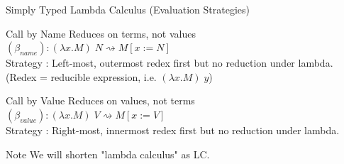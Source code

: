 \documentclass[10pt]{beamer}
\newcommand{\lam}[2]{\lambda #1 . #2}
\newcommand{\app}[2]{#1 \; #2}
\newcommand{\subst}[2]{[#1 := #2]}
\begin{document}
\begin{frame}[fragile]{Simply Typed Lambda Calculus (Evaluation Strategies)}
  \begin{alertblock}{Call by Name}
    Reduces on terms, not values \\
    $(\beta_{name}) : \app{(\lam{x}{M})}{N} \rightsquigarrow M \subst{x}{N}$ \\
    Strategy : Left-most, outermost redex first but no reduction under lambda. \\
    (Redex = reducible expression, i.e. $\app{(\lam{x}{M})}{y}$)
  \end{alertblock}

  \pause

  \begin{alertblock}{Call by Value}
    Reduces on values, not terms \\
    $(\beta_{value}) : \app{(\lam{x}{M})}{V} \rightsquigarrow M \subst{x}{V}$ \\
    Strategy : Right-most, innermost redex first but no reduction under lambda. \\

  \end{alertblock}

  \pause

  \begin{alertblock}{Note}
    We will shorten "lambda calculus" as LC.\\
  \end{alertblock}

\end{frame}
\end{document}
